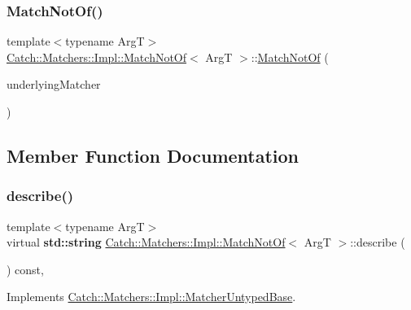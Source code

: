 \subsubsection{\texorpdfstring{Match\+Not\+Of()}{MatchNotOf()}}
{\footnotesize\ttfamily template$<$typename ArgT$>$ \\
\hyperlink{struct_catch_1_1_matchers_1_1_impl_1_1_match_not_of}{Catch\+::\+Matchers\+::\+Impl\+::\+Match\+Not\+Of}$<$ ArgT $>$\+::\hyperlink{struct_catch_1_1_matchers_1_1_impl_1_1_match_not_of}{Match\+Not\+Of} (\begin{DoxyParamCaption}\item[{\hyperlink{struct_catch_1_1_matchers_1_1_impl_1_1_matcher_base}{Matcher\+Base}$<$ ArgT $>$ const \&}]{underlying\+Matcher }\end{DoxyParamCaption})\hspace{0.3cm}{\ttfamily [inline]}}



\subsection{Member Function Documentation}
\mbox{\label{struct_catch_1_1_matchers_1_1_impl_1_1_match_not_of_a62bdc7dcb9ff000438a4ed3d5483a248}} 
\subsubsection{\texorpdfstring{describe()}{describe()}}
{\footnotesize\ttfamily template$<$typename ArgT$>$ \\
virtual \textbf{ std\+::string} \hyperlink{struct_catch_1_1_matchers_1_1_impl_1_1_match_not_of}{Catch\+::\+Matchers\+::\+Impl\+::\+Match\+Not\+Of}$<$ ArgT $>$\+::describe (\begin{DoxyParamCaption}{ }\end{DoxyParamCaption}) const\hspace{0.3cm}{\ttfamily [inline]}, {\ttfamily [virtual]}}



Implements \hyperlink{class_catch_1_1_matchers_1_1_impl_1_1_matcher_untyped_base_a91d3a907dbfcbb596077df24f6e11fe2}{Catch\+::\+Matchers\+::\+Impl\+::\+Matcher\+Untyped\+Base}.

